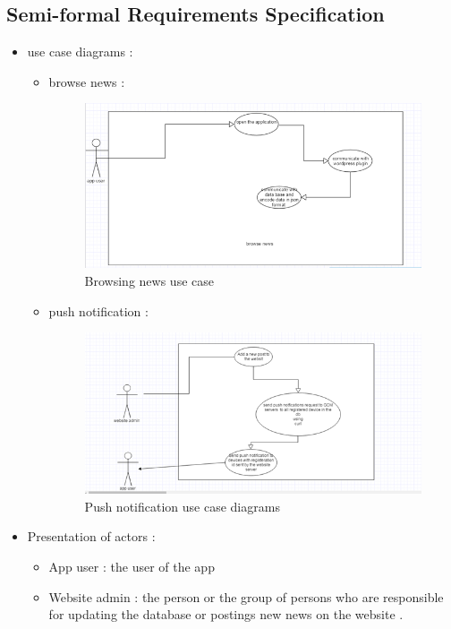 \subsection{Semi-formal Requirements Specification }


\begin{itemize}
\item use case diagrams :

\begin{itemize}
\item browse news :
\begin{figure}[h!]
	\includegraphics[width=13cm]{usecase1.png}
	\caption{Browsing news use case}
	\label{imag3}
\end{figure}
\item push notification :
 \begin{figure}[h!]
	\includegraphics[width=13cm]{usecase3.png}
	\caption{Push notification use case diagrams}
	\label{imag3}
\end{figure}
\end{itemize}
\item	Presentation of actors :
\begin{itemize}
\item App user : the user of the app 
\item Website admin : the person or the group of persons who are responsible for updating the database or postings new news on the website .


\end{itemize}
\end{itemize}
